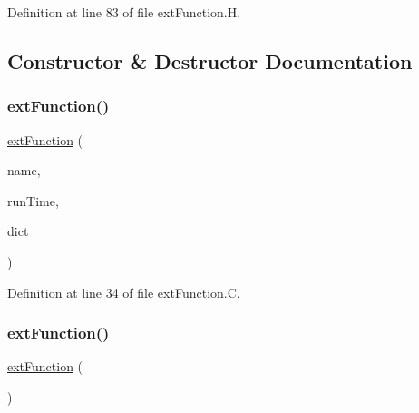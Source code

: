 Definition at line 83 of file ext\+Function.\+H.



\subsection{Constructor \& Destructor Documentation}
\mbox{\label{classFoam_1_1externalIOObject_1_1extFunction_a161ebaec6552bb4d3abbd9806b04c712}} 
\subsubsection{\texorpdfstring{ext\+Function()}{extFunction()}\hspace{0.1cm}{\footnotesize\ttfamily [1/2]}}
{\footnotesize\ttfamily \hyperlink{classFoam_1_1externalIOObject_1_1extFunction}{ext\+Function} (\begin{DoxyParamCaption}\item[{const word \&}]{name,  }\item[{const Time \&}]{run\+Time,  }\item[{const dictionary \&}]{dict }\end{DoxyParamCaption})}



Definition at line 34 of file ext\+Function.\+C.

\mbox{\label{classFoam_1_1externalIOObject_1_1extFunction_a8f34e66593a128659dda4ed542baafba}} 
\subsubsection{\texorpdfstring{ext\+Function()}{extFunction()}\hspace{0.1cm}{\footnotesize\ttfamily [2/2]}}
{\footnotesize\ttfamily \hyperlink{classFoam_1_1externalIOObject_1_1extFunction}{ext\+Function} (\begin{DoxyParamCaption}\item[{const \hyperlink{classFoam_1_1externalIOObject_1_1extFunction}{ext\+Function} \&}]{ }\end{DoxyParamCaption})\hspace{0.3cm}{\ttfamily [delete]}}

